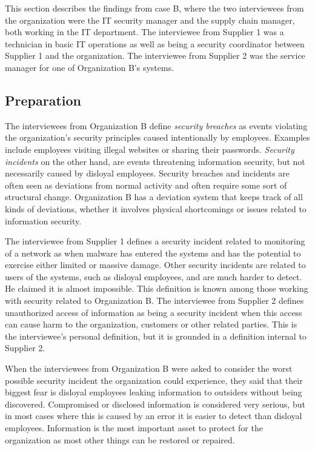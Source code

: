 This section describes the findings from case B, where the two interviewees from the organization were the IT security manager and the supply chain manager, both working in the IT department. The interviewee from Supplier 1 was a technician in basic IT operations as well as being a security coordinator between Supplier 1 and the organization. The interviewee from Supplier 2 was the service manager for one of Organization B's systems.

\subsection{Preparation}
The interviewees from Organization B define \textit{security breaches} as events violating the organization's security principles caused intentionally by employees. Examples include employees visiting illegal websites or sharing their passwords. \textit{Security incidents} on the other hand, are events threatening information security, but not necessarily caused by disloyal employees. Security breaches and incidents are often seen as deviations from normal activity and often require some sort of structural change. Organization B has a deviation system that keeps track of all kinds of deviations, whether it involves physical shortcomings or issues related to information security.

The interviewee from Supplier 1 defines a security incident related to monitoring of a network as when malware has entered the systems and has the potential to exercise either limited or massive damage. Other security incidents are related to users of the systems, such as disloyal employees, and are much harder to detect. He claimed it is almost impossible. This definition is known among those working with security related to Organization B. The interviewee from Supplier 2 defines unauthorized access of information as being a security incident when this access can cause harm to the organization, customers or other related parties. This is the interviewee's personal definition, but it is grounded in a definition internal to Supplier 2.

When the interviewees from Organization B were asked to consider the worst possible security incident the organization could experience, they said that their biggest fear is disloyal employees leaking information to outsiders without being discovered. Compromised or disclosed information is considered very serious, but in most cases where this is caused by an error it is easier to detect than disloyal employees. Information is the most important asset to protect for the organization as most other things can be restored or repaired.

